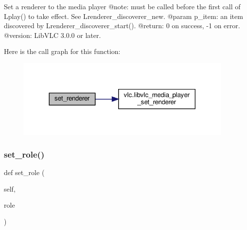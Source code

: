 \begin{DoxyVerb}Set a renderer to the media player
@note: must be called before the first call of L{play}() to
take effect.
See L{renderer_discoverer_new}.
@param p_item: an item discovered by L{renderer_discoverer_start}().
@return: 0 on success, -1 on error.
@version: LibVLC 3.0.0 or later.
\end{DoxyVerb}
 Here is the call graph for this function\+:
\nopagebreak
\begin{figure}[H]
\begin{center}
\leavevmode
\includegraphics[width=305pt]{classvlc_1_1_media_player_ac5e81ce9112a3e7c8ac0eecfc5334972_cgraph}
\end{center}
\end{figure}
\mbox{\label{classvlc_1_1_media_player_a8373b7774e0be368ecc17eaf9177df55}} 
\subsubsection{\texorpdfstring{set\+\_\+role()}{set\_role()}}
{\footnotesize\ttfamily def set\+\_\+role (\begin{DoxyParamCaption}\item[{}]{self,  }\item[{}]{role }\end{DoxyParamCaption})}

